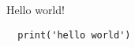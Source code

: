 \documentclass{article}
\begin{document}
Hello world!

\begin{verbatim}
  print('hello world')
\end{verbatim}
\end{document}
